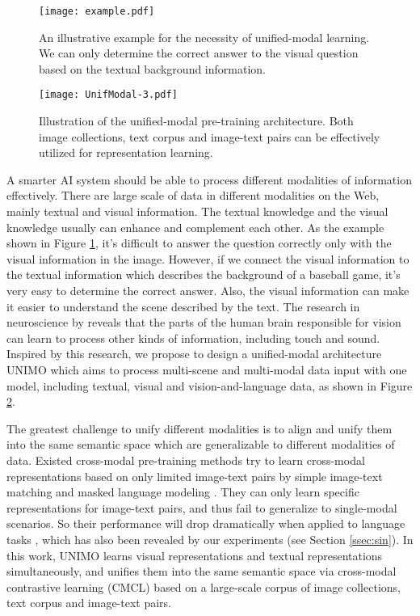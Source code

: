 \documentclass[11pt,a4paper]{article}
\begin{document}
\begin{figure}[t!]
	\centering
	\texttt{[image: example.pdf]}
	\caption{An illustrative example for the necessity of unified-modal learning. We can only determine the correct answer to the visual question based on the textual background information.}
	\label{fig:example}
\end{figure}


\begin{figure}[t!]
	\centering
	\texttt{[image: UnifModal-3.pdf]}
	\caption{Illustration of the unified-modal pre-training architecture. Both image collections, text corpus and image-text pairs can be effectively utilized for representation learning.}
	\label{fig:unifmodal}
\end{figure}


A smarter AI system should be able to process different modalities of information effectively.
There are large scale of data in different modalities on the Web, mainly textual and visual information.
The textual knowledge and the visual knowledge usually can enhance and complement each other.
As the example shown in Figure \ref{fig:example}, it's difficult to answer the question correctly only with the visual information in the image. 
However, if we connect the visual information to the textual information which describes the background of a baseball game, it's very easy to determine the correct answer.
Also, the visual information can make it easier to understand the scene described by the text.
The research in neuroscience by \citet{van2018neuronal} reveals that the parts of the human brain responsible for vision can learn to process other kinds of information, including touch and sound.
Inspired by this research, we propose to design a unified-modal architecture UNIMO which aims to process multi-scene and multi-modal data input with one model, including textual, visual and vision-and-language data, as shown in Figure \ref{fig:unifmodal}.

The greatest challenge to unify different modalities is to align and unify them into the same semantic space which are generalizable to different modalities of data.
Existed cross-modal pre-training methods try to learn cross-modal representations based on only limited image-text pairs by simple image-text matching and masked language modeling \citep{chen2020uniter}.
They can only learn specific representations for image-text pairs, and thus fail to generalize to single-modal scenarios.
So their performance will drop dramatically when applied to language tasks \citep{lin2020interbert}, which has also been revealed by our experiments (see Section \ref{ssec:sin}).
In this work, UNIMO learns visual representations and textual representations simultaneously, and unifies them into the same semantic space via cross-modal contrastive learning (CMCL) based on a large-scale corpus of image collections, text corpus and image-text pairs.
\end{document}
